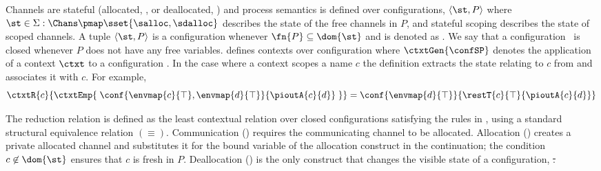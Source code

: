 \documentclass[copyright]{eptcs}
\begin{document}
Channels are stateful (allocated, \salloc, or deallocated, \sdalloc) and
process semantics is defined over configurations, $\langle \st, P\rangle$ where
$\st\in\Sigma  : \Chans \pmap \sset{\salloc, \sdalloc}$ describes the state of
the free channels in $P$, and stateful scoping  describes the
state of scoped channels.  A tuple $\langle \st, P\rangle$ is a configuration
whenever $\fn{P}\subseteq\dom{\st}$ and is denoted  as \confSP. We say that a
configuration \confSP\ is closed whenever $P$ does not have any free variables.
 defines contexts over configuration where
$\ctxtGen{\confSP}$ denotes the application of a context $\ctxt$ to a
configuration \confSP.  In the case where a context scopes a name $c$ the
definition extracts the state relating to $c$ from \st{} and associates it with
$c$. For example,
\begin{equation*}
\ctxtR{c}{\ctxtEmp{\;\conf{\envmap{c}{\top},\envmap{d}{\top}}{\pioutA{c}{d}}\;}}
=
\conf{\envmap{d}{\top}}{\restT{c}{\top}{\pioutA{c}{d}}}
\end{equation*}

The reduction relation is defined as the least contextual relation over closed
configurations satisfying the rules in , using a
standard \pic structural equivalence relation $(\equiv)$.  Communication
() requires the communicating channel to be allocated. Allocation
() creates a private allocated channel and substitutes it for the
bound variable of the allocation construct in the continuation; the condition
$c\not\in\dom{\st}$ ensures that $c$ is fresh in $P$. Deallocation ()
is the only construct that changes the visible state of a configuration, \st. 
\end{document}
